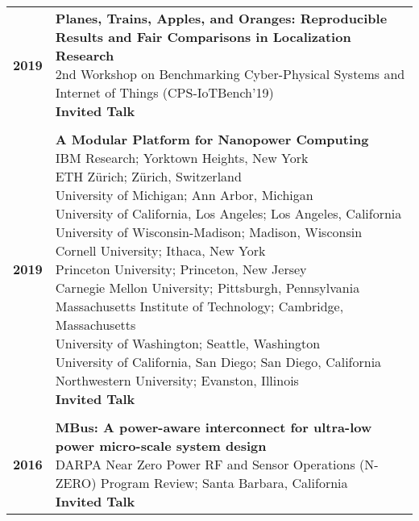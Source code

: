 \documentclass{article}
\begin{document}
\renewcommand{\arraystretch}{0.5}
\begin{longtable}{>{\bf}p{1cm} l}
  2019 & \makecell{
    \textbf{Planes, Trains, Apples, and Oranges: Reproducible Results and Fair Comparisons in Localization Research} \\
    2nd Workshop on Benchmarking Cyber-Physical Systems and Internet of Things (CPS-IoTBench'19) \\
    \textbf{\color{BrickRed} Invited Talk} \\
  } \\

  \\

  2019 & \makecell{
    \textbf{A Modular Platform for Nanopower Computing} \\
    IBM Research; Yorktown Heights, New York \\
    ETH Z\"urich; Z\"urich, Switzerland \\
    University of Michigan; Ann Arbor, Michigan \\
    University of California, Los Angeles; Los Angeles, California \\
    University of Wisconsin-Madison; Madison, Wisconsin \\
    Cornell University; Ithaca, New York \\
    Princeton University; Princeton, New Jersey \\
    Carnegie Mellon University; Pittsburgh, Pennsylvania \\
    Massachusetts Institute of Technology; Cambridge, Massachusetts \\
    University of Washington; Seattle, Washington \\
    University of California, San Diego; San Diego, California \\
    Northwestern University; Evanston, Illinois \\
    \textbf{\color{BrickRed} Invited Talk} \\
  } \\

  \\

  2016 & \makecell {
    \textbf{MBus: A power-aware interconnect for ultra-low power micro-scale system design} \\
    DARPA Near Zero Power RF and Sensor Operations (N-ZERO) Program Review; Santa Barbara, California \\
    \textbf{\color{BrickRed} Invited Talk} \\
  } \\


\end{longtable}
\end{document}
